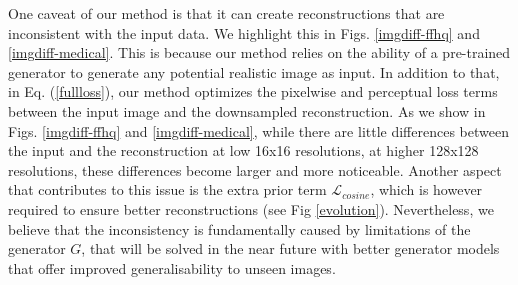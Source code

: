 \documentclass{article}
\newcommand{\fld}{results}
\newcommand{\loss}{\mathcal{L}}
\begin{document}
One caveat of our method is that it can create reconstructions that are inconsistent with the input data. We highlight this in Figs. \ref{imgdiff-ffhq} and \ref{imgdiff-medical}. This is because our method relies on the ability of a pre-trained generator to generate any potential realistic image as input. In addition to that, in Eq. (\ref{fullloss}), our method optimizes the pixelwise and perceptual loss terms between the input image and the downsampled reconstruction. As we show in Figs. \ref{imgdiff-ffhq} and \ref{imgdiff-medical}, while there are little differences between the input and the reconstruction at low 16x16 resolutions, at higher 128x128 resolutions, these differences become larger and more noticeable. Another aspect that contributes to this issue is the extra prior term $\loss_{cosine}$, which is however required to ensure better reconstructions (see Fig \ref{evolution}). Nevertheless, we believe that the inconsistency is fundamentally caused by limitations of the generator $G$, that will be solved in the near future with better generator models that offer improved generalisability to unseen images.



\newcommand{\diffFT}[1]{\fld/00607-recon-real-imagesffhq_test-super-resolution/image#1-target} \newcommand{\diffFO}[1]{\fld/00607-recon-real-imagesffhq_test-super-resolution/image#1-corrupted-step5000} \newcommand{\diffFD}[1]{\fld/00607-recon-real-imagesffhq_test-super-resolution/image#1-diff} 

\newcommand{\diffXT}[1]{\fld/00608-recon-real-imagesxray_frontal_test-super-resolution/image#1-target}
\newcommand{\diffXO}[1]{\fld/00608-recon-real-imagesxray_frontal_test-super-resolution/image#1-corrupted-step5000}
\newcommand{\diffXD}[1]{\fld/00608-recon-real-imagesxray_frontal_test-super-resolution/image#1-diff}


\newcommand{\diffBT}[1]{\fld/00626-recon-real-imagesbrains_test_mono-super-resolution/image#1-target}
\newcommand{\diffBO}[1]{\fld/00626-recon-real-imagesbrains_test_mono-super-resolution/image#1-corrupted-step5000}
\newcommand{\diffBD}[1]{\fld/00626-recon-real-imagesbrains_test_mono-super-resolution/image#1-diff}


\newcommand{\diffFTtwo}[1]{\fld/00620-recon-real-imagesffhq_test-super-resolution/image#1-target} \newcommand{\diffFOtwo}[1]{\fld/00620-recon-real-imagesffhq_test-super-resolution/image#1-corrupted-step5000} \newcommand{\diffFDtwo}[1]{\fld/00620-recon-real-imagesffhq_test-super-resolution/image#1-diff} 
\end{document}
